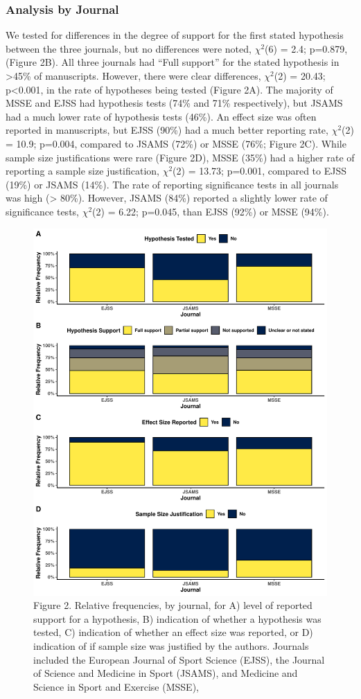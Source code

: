 \documentclass[]{cik}%
\begin{document}
\hypertarget{analysis-by-journal}{%
\subsubsection{Analysis by Journal}\label{analysis-by-journal}}

We tested for differences in the degree of support for the first stated
hypothesis between the three journals, but no differences were noted,
\(\chi^2\)(6) = 2.4; p=0.879, (Figure 2B). All three journals had ``Full
support'' for the stated hypothesis in \textgreater45\% of manuscripts.
However, there were clear differences, \(\chi^2\)(2) = 20.43;
p\textless0.001, in the rate of hypotheses being tested (Figure 2A). The
majority of MSSE and EJSS had hypothesis tests (74\% and 71\%
respectively), but JSAMS had a much lower rate of hypothesis tests
(46\%). An effect size was often reported in manuscripts, but EJSS
(90\%) had a much better reporting rate, \(\chi^2\)(2) = 10.9; p=0.004,
compared to JSAMS (72\%) or MSSE (76\%; Figure 2C). While sample size
justifications were rare (Figure 2D), MSSE (35\%) had a higher rate of
reporting a sample size justification, \(\chi^2\)(2) = 13.73; p=0.001,
compared to EJSS (19\%) or JSAMS (14\%). The rate of reporting
significance tests in all journals was high (\textgreater{} 80\%).
However, JSAMS (84\%) reported a slightly lower rate of significance
tests, \(\chi^2\)(2) = 6.22; p=0.045, than EJSS (92\%) or MSSE (94\%).

\newpage

\begin{figure}[H]
\includegraphics[width=0.5\linewidth]{figure2} \caption{Figure 2. Relative frequencies, by journal, for A) level of reported support for a hypothesis, B) indication of whether a hypothesis was tested, C) indication of whether an effect size was reported, or D) indication of if sample size was justified by the authors. Journals included the European Journal of Sport Science (EJSS), the Journal of Science and Medicine in Sport (JSAMS), and Medicine and Science in Sport and Exercise (MSSE), }\label{fig:fig2}
\end{figure}
\end{document}
